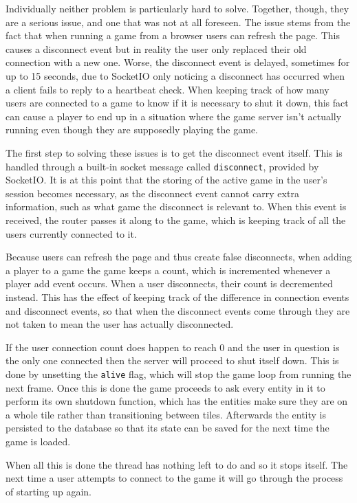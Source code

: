 Individually neither problem is particularly hard to solve. Together, though, they are a serious issue, and one that was not at all foreseen. The issue stems from the fact that when running a game from a browser users can refresh the page. This causes a disconnect event but in reality the user only replaced their old connection with a new one. Worse, the disconnect event is delayed, sometimes for up to 15 seconds, due to SocketIO only noticing a disconnect has occurred when a client fails to reply to a heartbeat check. When keeping track of how many users are connected to a game to know if it is necessary to shut it down, this fact can cause a player to end up in a situation where the game server isn't actually running even though they are supposedly playing the game.

The first step to solving these issues is to get the disconnect event itself. This is handled through a built-in socket message called \texttt{disconnect}, provided by SocketIO. It is at this point that the storing of the active game in the user's session becomes necessary, as the disconnect event cannot carry extra information, such as what game the disconnect is relevant to. When this event is received, the router passes it along to the game, which is keeping track of all the users currently connected to it.

Because users can refresh the page and thus create false disconnects, when adding a player to a game the game keeps a count, which is incremented whenever a player add event occurs. When a user disconnects, their count is decremented instead. This has the effect of keeping track of the difference in connection events and disconnect events, so that when the disconnect events come through they are not taken to mean the user has actually disconnected.

If the user connection count does happen to reach 0 and the user in question is the only one connected then the server will proceed to shut itself down. This is done by unsetting the \texttt{alive} flag, which will stop the game loop from running the next frame. Once this is done the game proceeds to ask every entity in it to perform its own shutdown function, which has the entities make sure they are on a whole tile rather than transitioning between tiles. Afterwards the entity is persisted to the database so that its state can be saved for the next time the game is loaded.

When all this is done the thread has nothing left to do and so it stops itself. The next time a user attempts to connect to the game it will go through the process of starting up again.

